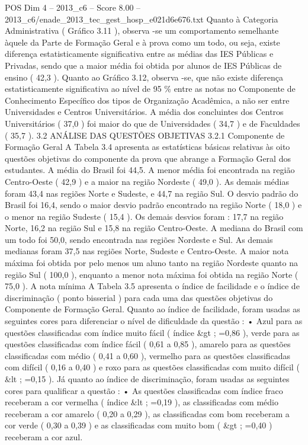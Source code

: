 \begin{textsample}{POS Dim 4 – 2013\_c6 – Score 8.00 – 2013\_c6/enade\_2013\_tec\_gest\_hosp\_e021d6e676.txt}
Quanto à Categoria Administrativa ( Gráfico 3.11 ), observa -se um comportamento semelhante àquele da Parte de Formação Geral e à prova como um todo, ou seja, existe diferença estatisticamente significativa entre as médias das IES Públicas e Privadas, sendo que a maior média foi obtida por alunos de IES Públicas de ensino ( 42,3 ).
Quanto ao Gráfico 3.12, observa -se, que não existe diferença estatisticamente significativa ao nível de 95 \% entre as notas no Componente de Conhecimento Específico dos tipos de Organização Acadêmica, a não ser entre Universidades e Centros Universitários.
A média dos concluintes dos Centros Universitários ( 37,0 ) foi maior do que de Universidades ( 34,7 ) e de Faculdades ( 35,7 ). 3.2 ANÁLISE DAS QUESTÕES OBJETIVAS 3.2.1 Componente de Formação Geral A Tabela 3.4 apresenta as estatísticas básicas relativas às oito questões objetivas do componente da prova que abrange a Formação Geral dos estudantes.
A média do Brasil foi 44,5.
A menor média foi encontrada na região Centro-Oeste ( 42,9 ) e a maior na região Nordeste ( 49,0 ).
As demais médias foram 43,4 nas regiões Norte e Sudeste, e 44,7 na região Sul.
O desvio padrão do Brasil foi 16,4, sendo o maior desvio padrão encontrado na região Norte ( 18,0 ) e o menor na região Sudeste ( 15,4 ).
Os demais desvios foram : 17,7 na região Norte, 16,2 na região Sul e 15,8 na região Centro-Oeste.
A mediana do Brasil com um todo foi 50,0, sendo encontrada nas regiões Nordeste e Sul.
As demais medianas foram 37,5 nas regiões Norte, Sudeste e Centro-Oeste.
A maior nota máxima foi obtida por pelo menos um aluno tanto na região Nordeste quanto na região Sul ( 100,0 ), enquanto a menor nota máxima foi obtida na região Norte ( 75,0 ).
A nota mínima A Tabela 3.5 apresenta o índice de facilidade e o índice de discriminação ( ponto bisserial ) para cada uma das questões objetivas do Componente de Formação Geral.
Quanto ao índice de facilidade, foram usadas as seguintes cores para diferenciar o nível de dificuldade da questão : • Azul para as questões classificadas com índice muito fácil ( índice \&gt ; =0,86 ), verde para as questões classificadas com índice fácil ( 0,61 a 0,85 ), amarelo para as questões classificadas com médio ( 0,41 a 0,60 ), vermelho para as questões classificadas com difícil ( 0,16 a 0,40 ) e roxo para as questões classificadas com muito difícil ( \&lt ; =0,15 ).
Já quanto ao índice de discriminação, foram usadas as seguintes cores para qualificar a questão : • As questões classificadas com índice fraco receberam a cor vermelha ( índice \&lt ; =0,19 ), as classificadas com médio receberam a cor amarelo ( 0,20 a 0,29 ), as classificadas com bom receberam a cor verde ( 0,30 a 0,39 ) e as classificadas com muito bom ( \&gt ; =0,40 ) receberam a cor azul.

\end{textsample}
